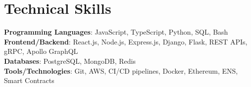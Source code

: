 \documentclass[letterpaper,11pt]{article}
\begin{document}

\section{Technical Skills}
\begin{itemize}[leftmargin=0.15in, label={}]
\small{\item{
\textbf{Programming Languages}{: JavaScript, TypeScript, Python, SQL, Bash} \\
\textbf{Frontend/Backend}{: React.js, Node.js, Express.js, Django, Flask, REST APIs, gRPC, Apollo GraphQL} \\
\textbf{Databases}{: PostgreSQL, MongoDB, Redis} \\
\textbf{Tools/Technologies}{: Git, AWS, CI/CD pipelines, Docker, Ethereum, ENS, Smart Contracts} \\
}}
\end{itemize}
\vspace{-16pt}

\end{document}
